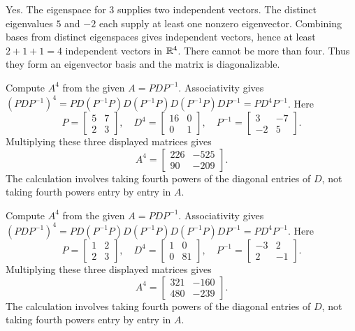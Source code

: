 Yes. The eigenspace for $3$ supplies two independent vectors. The distinct eigenvalues $5$ and $-2$ each supply at least one nonzero eigenvector. Combining bases from distinct eigenspaces gives independent vectors, hence at least $2+1+1=4$ independent vectors in $\mathbb{R}^4$. There cannot be more than four. Thus they form an eigenvector basis and the matrix is diagonalizable.

\goal Compute $A^4$ from the given $A=PDP^{-1}$.
Associativity gives $(PDP^{-1})^4=PD(P^{-1}P)D(P^{-1}P)D(P^{-1}P)DP^{-1}=PD^4P^{-1}$. Here
\[
P=\begin{bmatrix}5&7\\2&3\end{bmatrix},\quad D^4=\begin{bmatrix}16&0\\0&1\end{bmatrix},\quad P^{-1}=\begin{bmatrix}3&-7\\-2&5\end{bmatrix}.
\]
Multiplying these three displayed matrices gives
\[A^4=\begin{bmatrix}226&-525\\90&-209\end{bmatrix}.\]
The calculation involves taking fourth powers of the diagonal entries of $D$, not taking fourth powers entry by entry in $A$.

\goal Compute $A^4$ from the given $A=PDP^{-1}$.
Associativity gives $(PDP^{-1})^4=PD(P^{-1}P)D(P^{-1}P)D(P^{-1}P)DP^{-1}=PD^4P^{-1}$. Here
\[
P=\begin{bmatrix}1&2\\2&3\end{bmatrix},\quad D^4=\begin{bmatrix}1&0\\0&81\end{bmatrix},\quad P^{-1}=\begin{bmatrix}-3&2\\2&-1\end{bmatrix}.
\]
Multiplying these three displayed matrices gives
\[A^4=\begin{bmatrix}321&-160\\480&-239\end{bmatrix}.\]
The calculation involves taking fourth powers of the diagonal entries of $D$, not taking fourth powers entry by entry in $A$.

